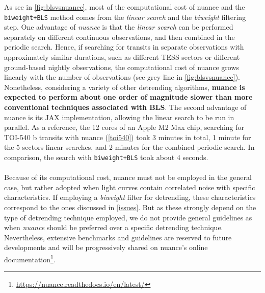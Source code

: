 \documentclass{aastex631}
\newcommand{\nuancemethod}{\textit{nuance}}
\newcommand{\nuancecode}{\textsf{nuance}}
\newcommand{\footlink}[1]{\footnote{\url{#1}}}
\begin{document}
As see in \autoref{fig:blsvsnuance}, most of the computational cost of \nuancecode{} and the \texttt{biweight+BLS} method comes from the \textit{linear search} and the \textit{biweight} filtering step. One advantage of \nuancemethod{} is that the \textit{linear search} can be performed separately on different continuous observations, and then combined in the periodic search. Hence, if searching for transits in separate observations with approximately similar durations, such as different TESS sectors or different ground-based nightly observations, the computational cost of \nuancecode{} grows linearly with the number of observations (see grey line in \autoref{fig:blsvsnuance}). Nonetheless, considering a variety of other detrending algorithms, \textbf{\nuancecode{} is expected to perform about one order of magnitude slower than more conventional techniques associated with \textsf{BLS}}. The second advantage of \nuancecode{} is its \textsf{JAX} implementation, allowing the linear search to be run in parallel. As a reference, the 12 cores of an Apple M2 Max chip, searching for TOI-540 b transits with nuance (\autoref{toi540}) took 3 minutes in total, 1 minute for the 5 sectors linear searches, and 2 minutes for the combined periodic search. In comparison, the search with \texttt{biweight+BLS} took about 4 seconds.\\\\
Because of its computational cost, \nuancecode{} must not be employed in the general case, but rather adopted when light curves contain correlated noise with specific characteristics. If employing a \textit{biweight} filter for detrending, these characteristics correspond to the ones discussed in \autoref{issues}. But as these strongly depend on the type of detrending technique employed, we do not provide general guidelines as when \nuancemethod{} should be preferred over a specific detrending technique. Nevertheless, extensive benchmarks and guidelines are reserved to future developments and will be progressively shared on \nuancecode{}'s online documentation\footlink{https://nuance.readthedocs.io/en/latest/}.
\end{document}
